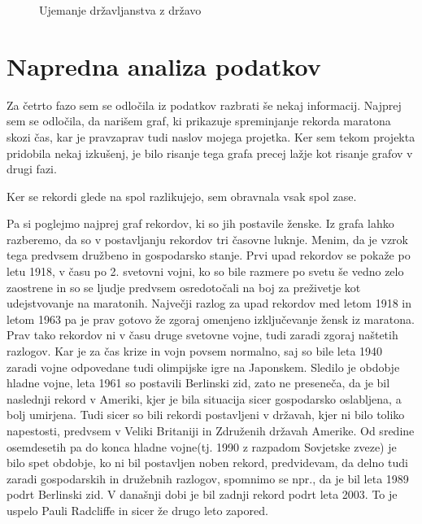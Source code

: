 \documentclass[11pt,a4paper]{article}
\begin{document}
\begin{figure}[H]
  \caption{Ujemanje državljanstva z državo}
  \label{fig:Zemljevid 2}
\end{figure}

\newpage
\section{Napredna analiza podatkov}

Za četrto fazo sem se odločila iz podatkov razbrati še nekaj informacij. Najprej sem se odločila, da narišem graf, ki prikazuje spreminjanje rekorda maratona skozi čas, kar je pravzaprav tudi naslov mojega projetka. Ker sem tekom projekta pridobila nekaj izkušenj, je bilo risanje tega grafa precej lažje kot risanje grafov v drugi fazi.

Ker se rekordi glede na spol razlikujejo, sem obravnala vsak spol zase.

Pa si poglejmo najprej graf rekordov, ki so jih postavile ženske.
Iz grafa lahko razberemo, da so v postavljanju rekordov tri časovne luknje. Menim, da je vzrok tega predvsem družbeno in gospodarsko stanje. Prvi upad rekordov se pokaže po letu 1918, v času po 2. svetovni vojni, ko so bile razmere po svetu še vedno zelo zaostrene in so se ljudje predvsem osredotočali na boj za preživetje kot udejstvovanje na maratonih.
Največji razlog za upad rekordov med letom 1918 in letom 1963 pa je prav gotovo že zgoraj omenjeno izključevanje žensk iz maratona.
Prav tako rekordov ni v času druge svetovne vojne, tudi zaradi zgoraj naštetih razlogov. Kar je za čas krize in vojn povsem normalno, saj so bile leta 1940 zaradi vojne odpovedane tudi olimpijske igre na Japonskem.
Sledilo je obdobje hladne vojne, leta 1961 so postavili Berlinski zid, zato ne preseneča, da je bil naslednji rekord v Ameriki, kjer je bila situacija sicer gospodarsko oslabljena, a bolj umirjena. Tudi sicer so bili rekordi postavljeni v državah, kjer ni bilo toliko napestosti, predvsem v Veliki Britaniji in Združenih državah Amerike.
Od sredine osemdesetih pa do konca hladne vojne(tj. 1990 z razpadom Sovjetske zveze) je bilo spet obdobje, ko ni bil postavljen noben rekord, predvidevam, da delno tudi zaradi gospodarskih in družebnih razlogov, spomnimo se npr., da je bil leta 1989 podrt Berlinski zid.
V današnji dobi je bil zadnji rekord podrt leta 2003. To je uspelo Pauli Radcliffe in sicer že drugo leto zapored.
\end{document}
